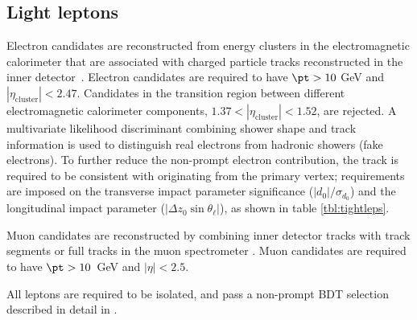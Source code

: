 \subsection{Light leptons}
\label{subsec:leps}

Electron candidates are reconstructed from energy clusters in the electromagnetic calorimeter that are associated with charged particle tracks reconstructed in the inner detector~\cite{ATLAS-CONF-2016-024}.  Electron candidates are required to have $\pt > 10$ GeV and $|\eta_\textrm{cluster}| < 2.47$. Candidates in the transition region between different electromagnetic calorimeter components, $1.37 < |\eta_\textrm{cluster}| < 1.52$, are rejected. A multivariate likelihood discriminant combining shower shape and track information is used to distinguish real electrons from hadronic showers (fake electrons). To further reduce the non-prompt electron contribution, the track is required to be consistent with originating from the primary vertex; requirements are imposed on the transverse impact parameter significance ($|d_0|/\sigma_{d_0}$) and the longitudinal impact parameter ($|\Delta z_0 \sin \theta_\ell|$), as shown in table \ref{tbl:tightleps}. 
                   
Muon candidates are reconstructed by combining inner detector tracks with track segments or full tracks in the muon spectrometer \cite{PERF-2014-05}. Muon candidates are required to have $\pt > 10$~GeV and $|\eta| < 2.5$. 

All leptons are required to be isolated, and pass a non-prompt BDT selection described in detail in \cite{ttH_paper}. 

